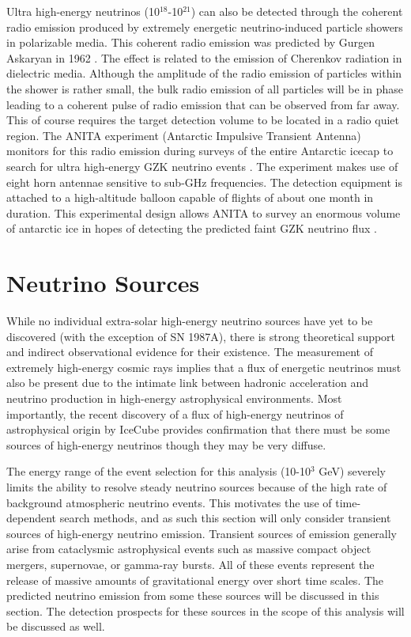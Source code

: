 \documentclass{gatech-thesis}
\begin{document}
Ultra high-energy neutrinos (10$^{18}$-10$^{21}$) can also be detected through the coherent radio emission produced by extremely energetic neutrino-induced particle showers in polarizable media. This coherent radio emission was predicted by Gurgen Askaryan in 1962 \cite{1962SovietJETPAskaryan}. The effect is related to the emission of Cherenkov radiation in dielectric media. Although the amplitude of the radio emission of particles within the shower is rather small, the bulk radio emission of all particles will be in phase leading to a coherent pulse of radio emission that can be observed from far away. This of course requires the target detection volume to be located in a radio quiet region. The ANITA experiment (Antarctic Impulsive Transient Antenna) monitors for this radio emission during surveys of the entire Antarctic icecap to search for ultra high-energy GZK neutrino events \cite{2010PhRvD..82b2004G}. The experiment makes use of eight horn antennae sensitive to sub-GHz frequencies. The detection equipment is attached to a high-altitude balloon capable of flights of about one month in duration. This experimental design allows ANITA to survey an enormous volume of antarctic ice in hopes of detecting the predicted faint GZK neutrino flux \cite{2006astro.ph..7109H}.

\chapter{Neutrino Sources}
While no individual extra-solar high-energy neutrino sources have yet to be discovered (with the exception of SN 1987A), there is strong theoretical support  and indirect observational evidence for their existence. The measurement of extremely high-energy cosmic rays implies that a flux of energetic neutrinos must also be present due to the intimate link between hadronic acceleration and neutrino production in high-energy astrophysical environments. Most importantly, the recent discovery of a flux of high-energy neutrinos of astrophysical origin by IceCube \cite{2013Sci...342E...1I} provides confirmation that there must be some sources of high-energy neutrinos though they may be very diffuse.

The energy range of the event selection for this analysis (10-10$^3$ GeV) severely limits the ability to resolve steady neutrino sources because of the high rate of background atmospheric neutrino events. This motivates the use of time-dependent search methods, and as such this section will only consider transient sources of high-energy neutrino emission. Transient sources of emission generally arise from cataclysmic astrophysical events such as massive compact object mergers, supernovae, or gamma-ray bursts. All of these events represent the release of massive amounts of gravitational energy over short time scales. The predicted neutrino emission from some these sources will be discussed in this section. The detection prospects for these sources in the scope of this analysis will be discussed as well.
\end{document}
